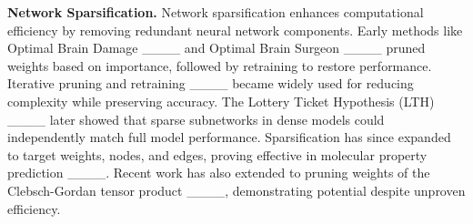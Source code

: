 \textbf{Network Sparsification.} Network sparsification enhances computational efficiency by removing redundant neural network components. Early methods like Optimal Brain Damage ____ and Optimal Brain Surgeon ____ pruned weights based on importance, followed by retraining to restore performance. Iterative pruning and retraining ____ became widely used for reducing complexity while preserving accuracy. The Lottery Ticket Hypothesis (LTH) ____ later showed that sparse subnetworks in dense models could independently match full model performance. Sparsification has since expanded to target weights, nodes, and edges, proving effective in molecular property prediction ____. Recent work has also extended to pruning weights of the Clebsch-Gordan tensor product ____, demonstrating potential despite unproven efficiency.
